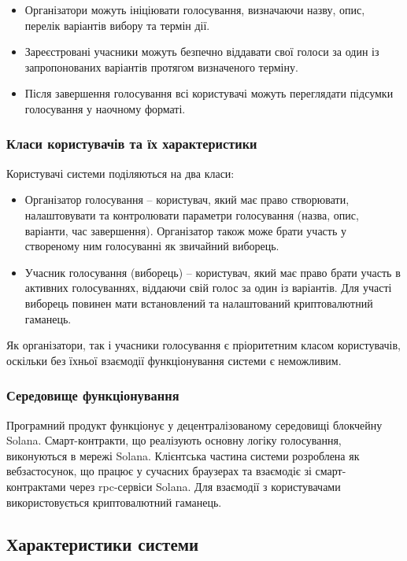 \documentclass[14pt]{extreport}
\begin{document}
  \begin{itemize}
    \item Організатори можуть ініціювати голосування, визначаючи назву, опис, перелік варіантів вибору та термін дії.
    \item Зареєстровані учасники можуть безпечно віддавати свої голоси за один із запропонованих варіантів протягом визначеного терміну.
    \item Після завершення голосування всі користувачі можуть переглядати підсумки голосування у наочному форматі.
  \end{itemize}
  
  \subsubsection{Класи користувачів та їх характеристики}
  Користувачі системи поділяються на два класи:
  \begin{itemize}
    \item Організатор голосування – користувач, який має право створювати, налаштовувати та контролювати параметри голосування (назва, опис, варіанти, час завершення). Організатор також може брати участь у створеному ним голосуванні як звичайний виборець.
    \item Учасник голосування (виборець) – користувач, який має право брати участь в активних голосуваннях, віддаючи свій голос за один із варіантів. Для участі виборець повинен мати встановлений та налаштований криптовалютний гаманець. 
  \end{itemize}
  
  Як організатори, так і учасники голосування є пріоритетним класом користувачів, оскільки без їхньої взаємодії функціонування системи є неможливим.
  
  \subsubsection{Середовище функціонування}
  Програмний продукт функціонує у децентралізованому середовищі блокчейну Solana. Смарт-контракти, що реалізують основну логіку голосування, виконуються в мережі Solana. Клієнтська частина системи розроблена як вебзастосунок, що працює у сучасних браузерах та взаємодіє зі смарт-контрактами через \gls{rpc}-сервіси Solana. Для взаємодії з користувачами використовується криптовалютний гаманець.

  \subsection{Характеристики системи}
\end{document}

